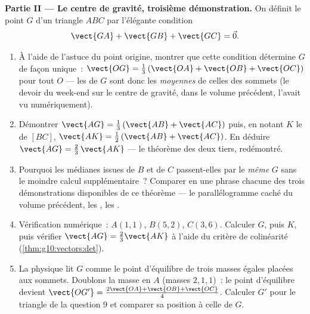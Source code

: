 \begin{problem}
\medskip
\noindent\textbf{Partie II --- Le centre de gravité, troisième
démonstration.}
On définit le point $G$ d'un triangle $ABC$ par l'élégante condition
\[
\vect{GA} + \vect{GB} + \vect{GC} = \vec 0 .
\]
\begin{enumerate}[resume]
  \item À l'aide de l'astuce du point origine, montrer que cette
        condition détermine $G$ de façon unique~:
        $\vect{OG} = \frac13\left(\vect{OA} + \vect{OB} +
        \vect{OC}\right)$ pour tout $O$ --- les  de $G$
        sont donc les \emph{moyennes} de celles des sommets (le
        devoir du week-end sur le centre de gravité, dans le volume
        précédent, l'avait vu numériquement).
  \item Démontrer $\vect{AG} = \frac13\left(\vect{AB} +
        \vect{AC}\right)$ puis, en notant $K$ le  de $[BC]$,
        $\vect{AK} = \frac12\left(\vect{AB} + \vect{AC}\right)$. En
        déduire $\vect{AG} = \frac23\,\vect{AK}$ --- le théorème des
        deux tiers, redémontré.
  \item Pourquoi les médianes issues de $B$ et de $C$ passent-elles
        par le \emph{même} $G$ sans le moindre calcul
        supplémentaire~? Comparer en une phrase chacune des trois
        démonstrations disponibles de ce théorème --- le
        parallélogramme caché du volume précédent, les ,
        les .
  \item Vérification numérique~: $A(1, 1)$, $B(5, 2)$, $C(3, 6)$.
        Calculer $G$, puis $K$, puis vérifier
        $\vect{AG} = \frac23 \vect{AK}$ à l'aide du critère de
        colinéarité (\cref{thm:g10:vectors:det}).
  \item La physique lit $G$ comme le point d'équilibre de trois
        masses égales placées aux sommets. Doublons la masse en $A$
        (masses $2, 1, 1$)~: le point d'équilibre devient
        $\vect{OG'} = \frac{2\vect{OA} + \vect{OB} +
        \vect{OC}}{4}$. Calculer $G'$ pour le triangle de la
        question 9 et comparer sa position à celle de $G$.
\end{enumerate}


\end{problem}
